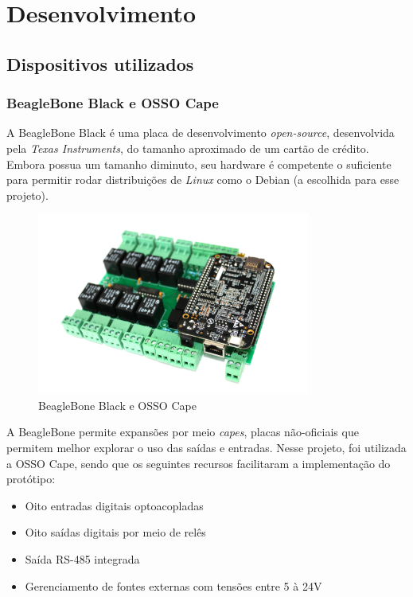 \chapter{Desenvolvimento}

\section{Dispositivos utilizados}

\subsection{BeagleBone Black e OSSO Cape}

A BeagleBone Black é uma placa de desenvolvimento \textit{open-source}, desenvolvida pela \textit{Texas Instruments}, do tamanho aproximado de um cartão de crédito. Embora possua um tamanho diminuto, seu hardware é competente o suficiente para permitir rodar distribuições de \textit{Linux} como o Debian (a escolhida para esse projeto).

\begin{figure}[H]
        \begin{center}
                \includegraphics[width=0.8\textwidth,natwidth=585,natheight=180]{assets/images/devices-beaglebone.jpg}
                \caption{BeagleBone Black e OSSO Cape}
                \label{fig:bbb}
        \end{center}
\end{figure}

A BeagleBone permite expansões por meio \textit{capes}, placas não-oficiais que permitem melhor explorar o uso das saídas e entradas. Nesse projeto, foi utilizada a OSSO Cape, sendo que os seguintes recursos facilitaram a implementação do protótipo:

\begin{itemize}
  \item Oito entradas digitais optoacopladas
  \item Oito saídas digitais por meio de relês
  \item Saída RS-485 integrada
  \item Gerenciamento de fontes externas com tensões entre 5 à 24V
\end{itemize}

